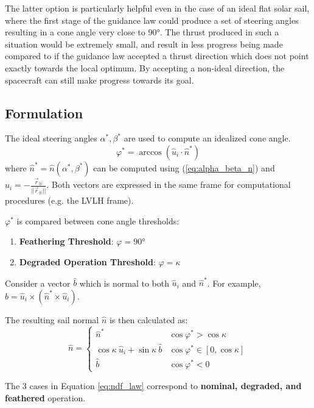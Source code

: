 The latter option is particularly helpful even in the case of an ideal flat solar sail, where the first stage of the guidance law could produce a set of steering angles resulting in a cone angle very close to \ang{90}. The thrust produced in such a situation would be extremely small, and result in less progress being made compared to if the guidance law accepted a thrust direction which does not point exactly towards the local optimum. By accepting a non-ideal direction, the spacecraft can still make progress towards its goal.

\subsection{Formulation}
The ideal steering angles $\alpha^*, \beta^*$ are used to compute an idealized cone angle.
\begin{equation}
    \varphi^* = \arccos(\hat{u}_i \cdot \hat{n}^*)
    \label{eq:cone_star}
\end{equation}
where $\hat{n}^* = \hat{n}(\alpha^*, \beta^*)$ can be computed using (\ref{eq:alpha_beta_n}) and $\hat{u}_i = -\frac{\vec{r}_{\astrosun}}{||\vec{r}_{\astrosun}||}$. Both vectors are expressed in the same frame for computational procedures (e.g. the LVLH frame).

$\varphi^*$ is compared between cone angle thresholds:
\begin{enumerate}
    \item \textbf{Feathering Threshold}: $\varphi = \ang{90}$
    \item \textbf{Degraded Operation Threshold}: $\varphi = \kappa$ 
\end{enumerate}

Consider a vector $\hat{b}$ which is normal to both $\hat{u}_i$ and $\hat{n}^*$. For example, $\hat{b} = \hat{u}_i \times (\hat{n}^* \times \hat{u}_i)$.

The resulting sail normal $\hat{n}$ is then calculated as:
\begin{equation}
    \hat{n} = \begin{cases}
        \hat{n}^* & \cos \varphi^* > \cos \kappa\\
        \cos \kappa \ \hat{u}_i + \sin \kappa \ \hat{b} & \cos \varphi^* \in  [ 0, \cos \kappa]\\
        \hat{b} & \cos \varphi^* < 0
    \end{cases}
    \label{eq:ndf_law}
\end{equation}

The 3 cases in Equation \ref{eq:ndf_law} correspond to \textbf{nominal, degraded, and feathered} operation.

